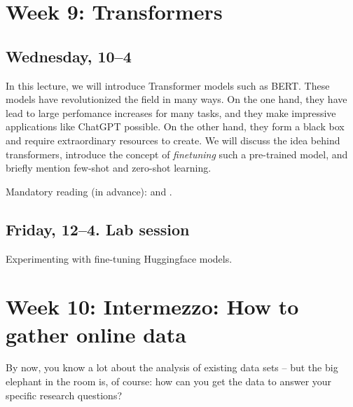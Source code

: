 
\section*{Week 9: Transformers}

\subsection*{Wednesday, 10--4}
In this lecture, we will introduce Transformer models such as BERT. These models have revolutionized the field in many ways. On the one hand, they have lead to large perfomance increases for many tasks, and they make impressive applications like ChatGPT possible. On the other hand, they form a black box and require extraordinary resources to create. We will discuss the idea behind transformers, introduce the concept of \emph{finetuning} such a pre-trained model, and briefly mention few-shot and zero-shot learning.

Mandatory reading (in advance): \cite{Lin2023} and \cite{Bender2021}.




\subsection*{Friday, 12--4. Lab session}

Experimenting with fine-tuning Huggingface models. 







\section*{Week 10: Intermezzo: How to gather online data}
By now, you know a lot about the analysis of existing data sets -- but the big elephant in the room is, of course: how can you get the data to answer your specific research questions?

